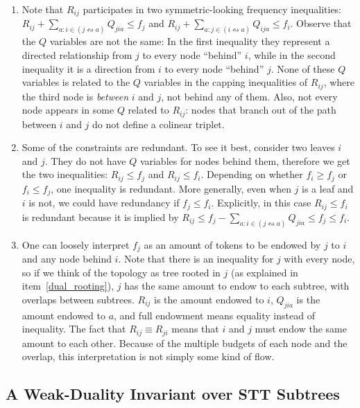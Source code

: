 \begin{enumerate}
    \item Note that $R_{ij}$ participates in two symmetric-looking frequency inequalities: \\$R_{ij} + \sum_{a : i \in (j \leftrightsquigarrow a)}{Q_{jia}} \le f_j$ and  $R_{ij} + \sum_{a : j \in (i \leftrightsquigarrow a)}{Q_{ija}} \le f_i$. Observe that the $Q$ variables are not the same: In the first inequality they represent a directed relationship from $j$ to every node ``behind'' $i$, while in the second inequality it is a direction from $i$ to every node ``behind'' $j$. None of these $Q$ variables is related to the $Q$ variables in the capping inequalities of $R_{ij}$, where the third node is \emph{between} $i$ and $j$, not behind any of them. Also, not every node appears in some $Q$ related to $R_{ij}$: nodes that branch out of the path between $i$ and $j$ do not define a colinear triplet.

    \item Some of the constraints are redundant. To see it best, consider two leaves $i$ and $j$. They do not have $Q$ variables for nodes behind them, therefore we get the two inequalities: $R_{ij} \le f_j$ and  $R_{ij} \le f_i$. Depending on whether $f_i \ge f_j$ or $f_i \le f_j$, one inequality is redundant. More generally, even when $j$ is a leaf and $i$ is not, we could have redundancy if $f_j \le f_i$. Explicitly, in this case $R_{ij} \le f_i$ is redundant because it is implied by $R_{ij} \le f_j - \sum_{a : i \in (j \leftrightsquigarrow a)}{Q_{jia}} \le f_j \le f_i$.

    \item One can loosely interpret $f_j$ as an amount of tokens to be endowed by $j$ to $i$ and any node behind $i$. Note that there is an inequality for $j$ with every node, so if we think of the topology as tree rooted in $j$ (as explained in item~\ref{dual_rooting}), $j$ has the same amount to endow to each subtree, with overlaps between subtrees. $R_{ij}$ is the amount endowed to $i$, $Q_{jia}$ is the amount endowed to $a$, and full endowment means equality instead of inequality. The fact that $R_{ij} \equiv R_{ji}$ means that $i$ and $j$ must endow the same amount to each other. Because of the multiple budgets of each node and the overlap, this interpretation is not simply some kind of flow.
\end{enumerate}


\subsection{A Weak-Duality Invariant over STT Subtrees}
\label{subsection_dual_LP_analysis_BST}

